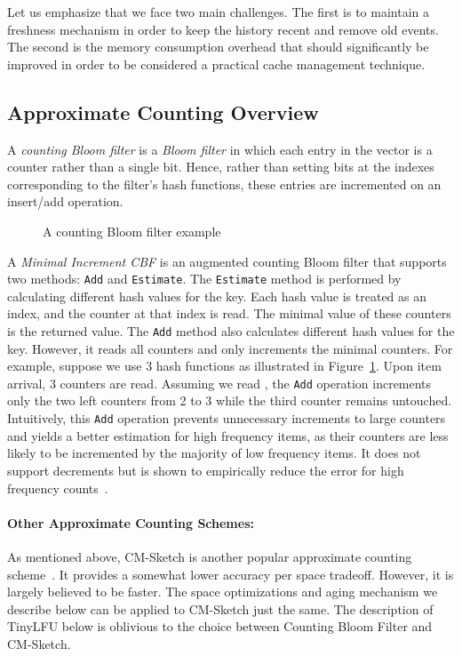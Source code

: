 \documentclass[10pt,a4paper]{article}
\begin{document}
Let us emphasize that we face two main challenges.
The first is to maintain a freshness mechanism in order to keep the history recent and remove old events.
The second is the memory consumption overhead that should significantly be improved in order to be considered a practical cache management technique.


\subsection{Approximate Counting Overview}


A \emph{counting Bloom filter} is a \emph{Bloom filter} in which each entry in the vector is a counter rather than a single bit.
Hence, rather than setting bits at the indexes corresponding to the filter's hash functions, these entries are incremented on an insert/add operation.

\begin{figure}[t]
\caption{A counting Bloom filter example}
\label{fig:MICBF}
\end{figure}

A \emph{Minimal Increment CBF} is an augmented counting Bloom filter that supports two methods: \texttt{Add} and \texttt{Estimate}.
The \texttt{Estimate} method is performed by calculating  different hash values for the key.
Each hash value is treated as an index, and the counter at that index is read.
The minimal value of these counters is the returned value.
The \texttt{Add} method also calculates  different hash values for the key.
However, it reads all  counters and only increments the minimal counters.
For example, suppose we use 3 hash functions as illustrated in Figure~\ref{fig:MICBF}.
Upon item arrival, 3 counters are read.
Assuming we read , the \texttt{Add} operation increments only the two left counters from 2 to 3 while the third counter remains untouched.
Intuitively, this \texttt{Add} operation prevents unnecessary increments to large counters and yields a better estimation for high frequency items, as their counters are less likely to be incremented by the majority of low frequency items.
It does not support decrements but is shown to empirically reduce the error for high frequency counts~\cite{SpectralBloom}.

\paragraph*{Other Approximate Counting Schemes:}
As mentioned above, CM-Sketch is another popular approximate counting scheme~\cite{CountMinSketch}.
It provides a somewhat lower accuracy per space tradeoff.
However, it is largely believed to be faster.
The space optimizations and aging mechanism we describe below can be applied to CM-Sketch just the same.
The description of TinyLFU below is oblivious to the choice between Counting Bloom Filter and CM-Sketch.
\end{document}
